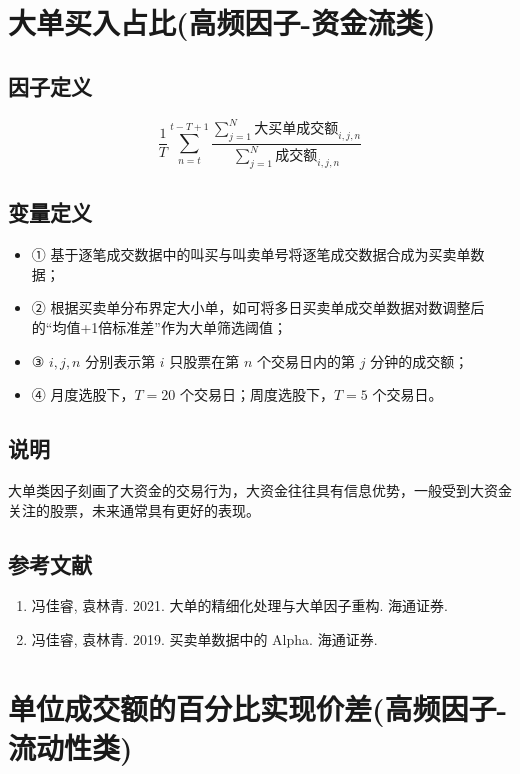 \documentclass{article}
\begin{document}
\section{大单买入占比(高频因子-资金流类)}

\subsection{因子定义}
\begin{equation}
    \frac{1}{T} \sum_{n=t}^{t-T+1} \frac{\sum_{j=1}^{N} \text{大买单成交额}_{i,j,n}}{\sum_{j=1}^{N} \text{成交额}_{i,j,n}}
\end{equation}

\subsection{变量定义}
\begin{itemize}
    \item ① 基于逐笔成交数据中的叫买与叫卖单号将逐笔成交数据合成为买卖单数据；
    \item ② 根据买卖单分布界定大小单，如可将多日买卖单成交单数据对数调整后的“均值+1倍标准差”作为大单筛选阈值；
    \item ③ \( i, j, n \) 分别表示第 \( i \) 只股票在第 \( n \) 个交易日内的第 \( j \) 分钟的成交额；
    \item ④ 月度选股下，\( T=20 \) 个交易日；周度选股下，\( T=5 \) 个交易日。
\end{itemize}

\subsection{说明}
大单类因子刻画了大资金的交易行为，大资金往往具有信息优势，一般受到大资金关注的股票，未来通常具有更好的表现。

\subsection{参考文献}
\begin{enumerate}
    \item 冯佳睿, 袁林青. 2021. 大单的精细化处理与大单因子重构. 海通证券.
    \item 冯佳睿, 袁林青. 2019. 买卖单数据中的 Alpha. 海通证券.
\end{enumerate}

\section{单位成交额的百分比实现价差(高频因子-流动性类)}
\end{document}
